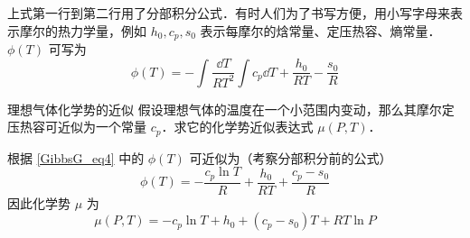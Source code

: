 上式第一行到第二行用了分部积分公式．有时人们为了书写方便，用小写字母来表示摩尔的热力学量，例如 $h_0,c_p,s_0$ 表示每摩尔的焓常量、定压热容、熵常量．$\phi(T)$ 可写为
\begin{equation}
\phi(T)=-\int\frac{\dd T}{RT^2}\int c_{p}\dd T+\frac{h_{0}}{RT}-\frac{s_{0}}{R}
\end{equation}

\begin{example}{理想气体化学势的近似}
假设理想气体的温度在一个小范围内变动，那么其摩尔定压热容可近似为一个常量 $c_p$．求它的化学势近似表达式 $\mu(P,T)$．

根据 \autoref{GibbsG_eq4} 中的 $\phi(T)$ 可近似为（考察分部积分前的公式）
\begin{equation}
\phi(T)=-\frac{c_p\ln T}{R}+\frac{h_0}{RT}+\frac{c_p-s_0}{R}
\end{equation}
因此化学势 $\mu$ 为
\begin{equation}\label{GibbsG_eq5}
\mu(P,T)=-c_p\ln T+h_0+(c_p-s_0)T+RT\ln P
\end{equation}

\end{example}
